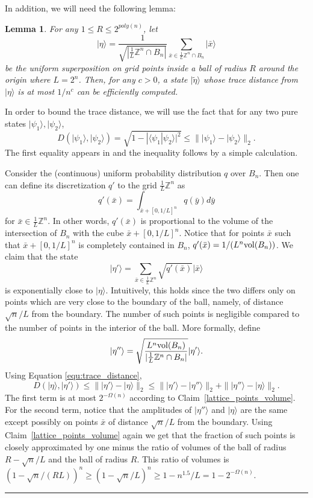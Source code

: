 \documentclass[11pt]{article}
\newtheorem{lemma}[theorem]{Lemma}
\newcommand{\qedsymb}{\hfill{\rule{2mm}{2mm}}}
\newenvironment{proof}{\begin{trivlist}
\item[\hspace{\labelsep}{\sl\noindent Proof:\/}]
}{\qedsymb\end{trivlist}}
\def\Z{\mathbb{Z}}
\def\vol{{\rm vol}}
\newcommand\ket[1]{{ |{#1} \rangle }}
\begin{document}
In addition, we will need the following lemma:
\begin{lemma}\label{quantum_superposition}
For any $1\le R \le 2^{poly(n)}$, let
$$ \ket{\eta} = \frac{1}{\sqrt{|\frac{1}{L}\Z^n \cap B_n|}}\sum_{\bar{x} \in \frac{1}{L}\Z^n \cap B_n} \ket{\bar{x}} $$
be the uniform superposition on grid points inside a ball of radius $R$ around the origin where $L=2^n$. Then, for any
$c>0$, a state $\ket{\tilde{\eta}}$ whose trace distance from $\ket{\eta}$ is at most $1/n^c$ can be efficiently
computed.
\end{lemma}
\begin{proof}
In order to bound the trace distance, we will use the fact that for any two pure states $\ket{\psi_1},\ket{\psi_2}$,
 \begin{equation}\label{equ:trace_distance}
 D(\ket{\psi_1},\ket{\psi_2}) = \sqrt{1-|\langle \psi_1 | \psi_2 \rangle|^2} \le \| \ket{\psi_1} - \ket{\psi_2} \|_2.
 \end{equation}
The first equality appears in \cite{NielsenChuang} and the inequality follows by a simple calculation.

Consider the (continuous) uniform probability distribution $q$ over $B_n$. Then one can define its discretization $q'$
to the grid $\frac{1}{L} \Z^n$ as
$$q'(\bar{x}) = \int_{\bar{x}+[0, 1/L]^n} q(\bar{y}) d\bar{y}$$
for $\bar{x} \in \frac{1}{L} \Z^n$. In other words, $q'(\bar{x})$ is proportional to the volume of the intersection of
$B_n$ with the cube $\bar{x}+[0,1/L]^n$. Notice that for points $\bar{x}$ such that $\bar{x}+[0,1/L]^n$ is completely
contained in $B_n$, $q'(\bar{x})=1/(L^n \vol(B_n))$. We claim that the state
$$ \ket{\eta'} = \sum_{\bar{x}\in \frac{1}{L} \Z^n}  \sqrt{q'(\bar{x})} \ket{\bar{x}} $$
is exponentially close to $\ket{\eta}$. Intuitively, this holds since the two differs only on points which are very
close to the boundary of the ball, namely, of distance $\sqrt{n}/L$ from the boundary. The number of such points is
negligible compared to the number of points in the interior of the ball. More formally, define
$$ \ket{\eta''} = \sqrt{\frac{L^n\vol(B_n)}{|\frac{1}{L}\Z^n \cap B_n|}} \ket{\eta'}.$$
Using Equation \ref{equ:trace_distance},
$$ D(\ket{\eta}, \ket{\eta'}) \le \| \ket{\eta'} - \ket{\eta} \|_2 \le \| \ket{\eta'} - \ket{\eta''} \|_2 + \| \ket{\eta''} - \ket{\eta} \|_2.$$
The first term is at most $2^{-\Omega(n)}$ according to Claim~\ref{lattice_points_volume}. For the second term, notice
that the amplitudes of $\ket{\eta''}$ and $\ket{\eta}$ are the same except possibly on points $\bar{x}$ of distance
$\sqrt{n}/L$ from the boundary. Using Claim~\ref{lattice_points_volume} again we get that the fraction of such points
is closely approximated by one minus the ratio of volumes of the ball of radius $R-\sqrt{n}/L$ and the ball of radius
$R$. This ratio of volumes is $(1- \sqrt{n} /(RL))^n \ge (1-\sqrt{n}/L)^n \ge 1-n^{1.5}/L = 1-2^{-\Omega(n)}$.


\end{proof}
\end{document}
